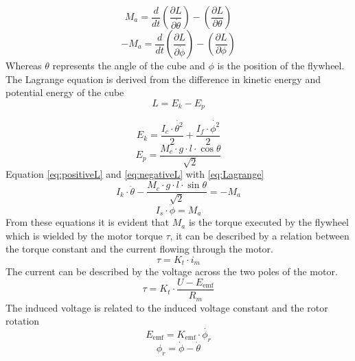 \documentclass[a4paper,11pt]{kth-mag}
\begin{document}
\begin{equation} \label{eq:positiveL}
M_a=\frac{d}{dt}\left(\frac{\partial L}{\partial \dot{\theta}}\right)-\left(\frac{\partial L}{\partial \theta}\right)
\end{equation}
\begin{equation} \label{eq:negativeL}
-M_a=\frac{d}{dt}\left(\frac{\partial L}{\partial \dot{\phi}}\right)-\left(\frac{\partial L}{\partial \phi}\right)
\end{equation}
Whereas $\theta$ represents the angle of the cube and $\phi$ is the position of the flywheel. \\
The Lagrange equation is derived from the difference in kinetic energy and potential energy of the cube
\begin{equation} \label{eq:Lagrange}
L = E_k - E_p
\end{equation}

\begin{equation}
E_k = \frac{I_c \cdot \dot{\theta^2}}{2} + \frac{I_f \cdot \dot{\phi^2} }{2}
\end{equation}
\begin{equation}
E_p = \frac{M_c \cdot g \cdot l \cdot \cos \theta}{\sqrt{2}}
\end{equation}
Equation \eqref{eq:positiveL} and \eqref{eq:negativeL} with \eqref{eq:Lagrange}
\begin{equation} \label{eq:negativeL2}
I_k \cdot \ddot{\theta} - \frac{M_c \cdot g \cdot l \cdot \sin \theta }{\sqrt{2}}  = -M_a
\end{equation}
\begin{equation} \label{eq:postiveL2}
I_s \cdot \ddot{\phi} = M_a
\end{equation}
From these equations it is evident that $M_a$ is the torque executed by the flywheel which is wielded by the motor torque $\tau$, it can be described by a relation between the torque constant and the current flowing through the motor.
\begin{equation}
\tau = K_t \cdot i_m
\end{equation}
The current can be described by the voltage across the two poles of the motor. 
\begin{equation}
\tau = K_t \cdot \frac{U-E_{\text{emf}} }{R_m}
\end{equation}
The induced voltage is related to the induced voltage constant and the rotor rotation
\begin{equation}
E_{\text{emf}} = K_{\text{emf}} \cdot \dot{\phi_r}
\end{equation}
\begin{equation}
\phi_r = \dot{\phi} - \dot{\theta}
\end{equation}
 
\end{document}
